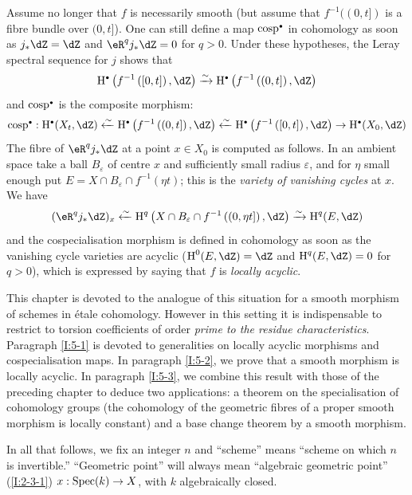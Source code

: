 Assume no longer that $f$ is necessarily smooth (but assume that
$f^{-1}((0,t])$ is a fibre bundle over $(0,t]$). One can still define a map
$\cosp^\bullet$ in cohomology as soon as $j_* \dZ=\dZ$ and
$\eR^q j_* \dZ = 0$ for $q>0$. Under these hypotheses, the Leray spectral
sequence for $j$ shows that
\[
  \h^\bullet\left(f^{-1}\left([0,t]\right),\dZ\right) \iso \h^\bullet\left(f^{-1}\left((0,t]\right),\dZ\right)
\]
and $\cosp^\bullet$ is the composite morphism:
\[
  \cosp^\bullet : \h^\bullet(X_t,\dZ)
    \xleftarrow\sim \h^\bullet\left(f^{-1}\left((0,t]\right),\dZ\right)
    \xleftarrow\sim \h^\bullet\left(f^{-1}\left([0,t]\right),\dZ\right)
    \to \h^\bullet(X_0,\dZ)
\]
The fibre of $\eR^q j_* \dZ$ at a point $x\in X_0$ is computed as follows. In
an ambient space take a ball $B_\varepsilon$ of centre $x$ and sufficiently
small radius $\varepsilon$, and for $\eta$ small enough put
$E=X\cap B_\varepsilon \cap f^{-1}(\eta t)$; this is the \emph{variety of
vanishing cycles} at $x$. We have
\[
  (\eR^q j_* \dZ)_x \xleftarrow\sim \h^q\left(X\cap B_\varepsilon\cap f^{-1}\left((0,\eta t]\right),\dZ\right) \xrightarrow\sim \h^q(E,\dZ)
\]
and the cospecialisation morphism is defined in cohomology as soon as the
vanishing cycle varieties are acyclic ($\h^0(E,\dZ)=\dZ$ and
$\h^q(E,\dZ) = 0$ for $q>0$), which is expressed by saying that $f$ is
\emph{locally acyclic}.

This chapter is devoted to the analogue of this situation for a smooth
morphism of schemes in \'etale cohomology. However in this setting it is
indispensable to restrict to torsion coefficients of order \emph{prime to the
residue characteristics}. Paragraph \ref{I:5-1} is devoted
to generalities on locally acyclic morphisms and
cospecialisation maps. In paragraph \ref{I:5-2}, we prove
that a smooth morphism is locally acyclic. In paragraph \ref{I:5-3}, we
combine this result with those of the preceding chapter to deduce two
applications: a theorem on the specialisation of cohomology groups (the
cohomology of the geometric fibres of a proper smooth morphism is
locally constant) and a base change theorem by a smooth morphism.

In all that follows, we fix an integer $n$ and ``scheme'' means ``scheme
on which $n$ is invertible.'' ``Geometric point'' will always mean
``algebraic geometric point'' (\ref{I:2-3-1}) $x:\operatorname{Spec}(k)\to X$, with $k$
algebraically closed. 










